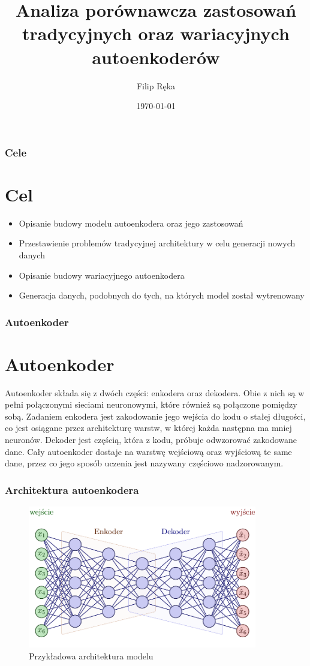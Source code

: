 \documentclass{beamer}
\title[]{Analiza porównawcza zastosowań tradycyjnych oraz wariacyjnych autoenkoderów}
\institute[UMCS]
{
	Uniwersytet Marii Curie Skłodowskiej
	\medskip
}
\author{Filip Ręka}
\date{\today}
\begin{document}
	\begin{frame}
		\titlepage
	\end{frame}

	\begin{frame}
		\tableofcontents
	\end{frame}
	\begin{frame}
		\frametitle{Cele}
		\section{Cel}
		\begin{itemize}
			\item Opisanie budowy modelu autoenkodera oraz jego zastosowań
			\item Przestawienie problemów tradycyjnej architektury w celu generacji nowych danych
			\item Opisanie budowy wariacyjnego autoenkodera
			\item Generacja danych, podobnych do tych, na których model został wytrenowany
		\end{itemize}
	\end{frame}
	\begin{frame}
		\frametitle{Autoenkoder}
		\section{Autoenkoder}
		Autoenkoder składa się z dwóch części: enkodera oraz dekodera. Obie z nich są w pełni połączonymi sieciami neuronowymi, które również są połączone pomiędzy sobą. Zadaniem enkodera jest zakodowanie jego wejścia do kodu o stałej długości, co jest osiągane przez architekturę warstw, w której każda następna ma mniej neuronów. Dekoder jest częścią, która z kodu, próbuje odwzorować zakodowane dane. Cały autoenkoder dostaje na warstwę wejściową oraz wyjściową te same dane, przez co jego sposób uczenia jest nazywany częściowo nadzorowanym. 
	\end{frame}

	\begin{frame}
		\frametitle{Architektura autoenkodera}
		\begin{figure}
			\centering\includegraphics[width=10cm]{tikzae.pdf}
			\caption{Przykładowa architektura modelu}
		\end{figure}
	\end{frame}
\end{document}
